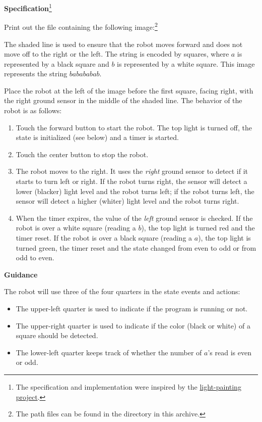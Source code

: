 \textbf{Specification}\footnote{The specification and implementation
were inspired by the \href{https://www.thymio.org/en:barcodelightpainting}{light-painting project}.}

Print out the file  containing the
following image:\footnote{The path files can be found in the directory
 in this archive.}


The shaded line is used to ensure that the robot moves forward and does
not move off to the right or the left. The string is encoded by squares,
where $a$ is represented by a black square and $b$ is represented by a
white square. This image represents the string $babababab$.

Place the robot at the left of the image before the first square, facing
right, with the right ground sensor in the middle of the shaded line.
The behavior of the robot is as follows:

\begin{enumerate}

\item Touch the forward button to start the robot. The top light is
turned off, the state is initialized (see below) and a timer is started.

\item Touch the center button to stop the robot.

\item The robot moves to the right. It uses the \emph{right} ground
sensor to detect if it starts to turn left or right. If the robot turns
right, the sensor will detect a lower (blacker) light level and the
robot turns left; if the robot turns left, the sensor will detect a
higher (whiter) light level and the robot turns right.

\item When the timer expires, the value of the \emph{left} ground sensor
is checked. If the robot is over a white square (reading a $b$), the top
light is turned red and the timer reset. If the robot is over a black
square (reading a $a$), the top light is turned green, the timer reset
and the state changed from even to odd or from odd to even.

\end{enumerate}


\textbf{Guidance}

The robot will use three of the four quarters in the state events and
actions:

\begin{itemize}
\item The upper-left quarter is used to indicate if the program is
running or not.
\item The upper-right quarter is used to indicate if the color (black or
white) of a square should be detected.
\item The lower-left quarter keeps track of whether the
number of $a$'s read is even or odd.
\end{itemize}

